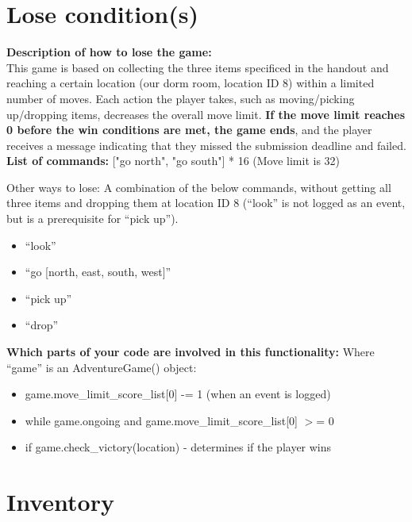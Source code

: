 \documentclass[11pt]{article}
\begin{document}
\section*{Lose condition(s)}
\textbf{Description of how to lose the game:} \\
    This game is based on collecting the three items specificed in the handout and reaching a certain location (our dorm room, location ID 8) within a limited number of moves. Each action the player takes, such as moving/picking up/dropping items, decreases the overall move limit. \textbf{If the move limit reaches 0 before the win conditions are met, the game ends}, and the player receives a message indicating that they missed the submission deadline and failed. \\


\textbf{List of commands:} ["go north", "go south"] * 16 (Move limit is 32)

Other ways to lose: A combination of the below commands, without getting all three items and dropping them at location ID 8 (``look'' is not logged as an event, but is a prerequisite for ``pick up'').
\begin{itemize}
    \item ``look''
    \item ``go [north, east, south, west]''
    \item ``pick up''
    \item ``drop'' \\
\end{itemize}

\textbf{Which parts of your code are involved in this functionality:}
Where ``game'' is an AdventureGame() object:
\begin{itemize}
    \item game.move\_limit\_score\_list[0] -= 1 (when an event is logged)
    \item while game.ongoing and game.move\_limit\_score\_list[0] \(>\)= 0
    \item if game.check\_victory(location) -\> determines if the player wins
\end{itemize}



\section*{Inventory}
\end{document}
